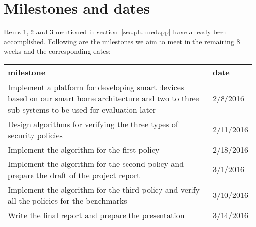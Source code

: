 \documentclass{article}
\begin{document}
\section{Milestones and dates}
Items 1, 2 and 3 mentioned in section~\ref{sec:plannedapp} have already been accomplished. 
Following are the milestones we aim to meet in the remaining 8 weeks and the corresponding dates:
\begin{table}
\begin{center}
\begin{tabular}{|p{5cm}|p{2cm}|}
\hline 
milestone & date \\ \hline
Implement a platform for developing smart devices based on our smart home architecture and  two to three sub-systems to be used for evaluation later & 2/8/2016 \\\hline
Design algorithms for verifying the three types of security policies & 2/11/2016 \\\hline
Implement the algorithm for the first policy & 2/18/2016 \\\hline
Implement the algorithm for the second policy and prepare the draft of the project report & 3/1/2016  \\\hline
Implement the algorithm for the third policy and verify all the policies for the benchmarks & 3/10/2016 \\\hline
Write the final report and prepare the presentation & 3/14/2016 \\\hline

\end{tabular}
\end{center}
\end{table}




\end{document}
